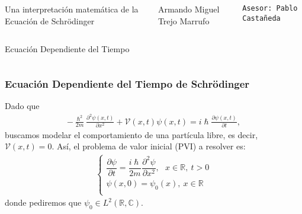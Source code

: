 \documentclass[aspectratio=1610]{beamer}
\newcommand*{\field}[1]{\mathbb{#1}}
\begin{document}
\begin{frame}

  \vspace{0.02\textheight}
  
\begin{columns}[]
\column{37em}
\Large{\centerline{Una interpretación matemática de la Ecuación de Schrödinger}}

\vspace{0.1\textheight}

\vspace{0.1\textheight}

\small{\centerline{Armando Miguel Trejo Marrufo}}
\scriptsize{\centerline{\tt Asesor: Pablo Castañeda}}
\scriptsize{\centerline{}}
\end{columns}
\end{frame}


\begin{frame}
\begin{columns}
\column{37em}
\vspace{1cm}
\Huge{\centerline{Ecuación Dependiente del Tiempo}}
\end{columns}
\end{frame}


\begin{frame}
\frametitle{Ecuación Dependiente del Tiempo de Schrödinger}

Dado que 
\begin{align*}
    -\frac{\hslash^2}{2m}\frac{\partial^2\psi(x,t)}{\partial x^2} + \mathcal{V}(x,t)\psi(x,t) = i\hslash\frac{\partial\psi(x,t)}{\partial t},
\end{align*}
buscamos modelar el comportamiento de una partícula libre, es decir, $\mathcal{V}(x,t) = 0$. Así,
el problema de valor inicial (PVI) a resolver es:
    \begin{align}
         \left\{ \begin{array}{ll}
         \dfrac{\partial\psi}{\partial t} = \dfrac{i\hslash}{2m}\dfrac{\partial^2\psi}{\partial x^2},\:\:\:x\in\field{R},\:t>0 \\
         \psi(x,0) = \psi_{0}(x),\:x\in\field{R} \\
         \end{array}
\right.
    \label{eq:TISchrodinger}
    \end{align}
donde pediremos que $\psi_{0} \in L^2(\field{R},\field{C})$.
\begin{columns}
\column{37em}
\end{columns}
\end{frame}
\end{document}
